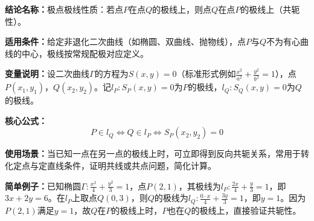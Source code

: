 \textbf{结论名称：}极点极线性质：若点$P$在点$Q$的极线上，则点$Q$在点$P$的极线上（共轭性）。

\textbf{适用条件：}给定非退化二次曲线（如椭圆、双曲线、抛物线），点$P$与$Q$不为有心曲线的中心，极线按常规配极对应定义。

\textbf{变量说明：}设二次曲线$\Gamma$的方程为$S(x,y)=0$（标准形式例如$\frac{x^2}{a^2}+\frac{y^2}{b^2}=1$），点$P(x_1,y_1)$，$Q(x_2,y_2)$。记$l_P:S_P(x,y)=0$为$P$的极线，$l_Q:S_Q(x,y)=0$为$Q$的极线。

\textbf{核心公式：}
\[
\boxed{P\in l_Q \iff Q\in l_P \iff S_P(x_2,y_2)=0}
\]

\textbf{使用场景：}当已知一点在另一点的极线上时，可立即得到反向共轭关系，常用于转化定点与定直线条件，证明共线或共点问题，简化计算。

\textbf{简单例子：}已知椭圆$\Gamma:\frac{x^2}{4}+\frac{y^2}{3}=1$，点$P(2,1)$，其极线为$l_P:\frac{2x}{4}+\frac{y}{3}=1$，即$3x+2y=6$。在$l_P$上取点$Q(0,3)$，则$Q$的极线为$l_Q:\frac{0\cdot x}{4}+\frac{3y}{3}=1$，即$y=1$。因为$P(2,1)$满足$y=1$，故$Q$在$P$的极线上时，$P$也在$Q$的极线上，直接验证共轭性。